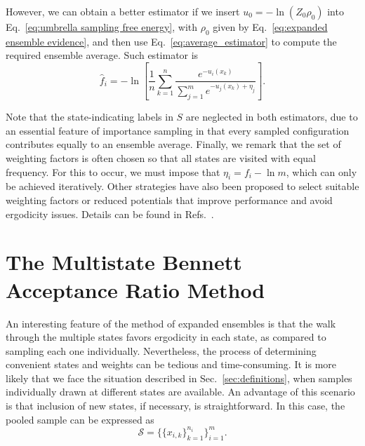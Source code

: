 \documentclass[aip,jcp,reprint,amsmath,amssymb]{revtex4-1}
\begin{document}
However, we can obtain a better estimator if we insert $u_0 = -\ln(Z_0\rho_0)$ into Eq.~\eqref{eq:umbrella sampling free energy}, with $\rho_0$ given by Eq.~\eqref{eq:expanded ensemble evidence}, and then use Eq.~\eqref{eq:average_estimator} to compute the required ensemble average. Such estimator is
\begin{equation}
\label{eq:expanded ensemble FEP estimator}
\hat f_i = -\ln \left[ \frac{1}{n}\sum_{k=1}^n \frac{e^{-u_i(x_k)}}{\sum_{j=1}^m e^{-u_j(x_k) + \eta_j}} \right].
\end{equation}

Note that the state-indicating labels in $S$ are neglected in both estimators, due to an essential feature of importance sampling in that every sampled configuration contributes equally to an ensemble average. Finally, we remark that the set of weighting factors is often chosen so that all states are visited with equal frequency. For this to occur, we must impose that $\eta_i = f_i - \ln m$, which can only be achieved iteratively. Other strategies have also been proposed to select suitable weighting factors or reduced potentials that improve performance and avoid ergodicity issues. Details can be found in Refs.~.

\section{The Multistate Bennett Acceptance Ratio Method}

An interesting feature of the method of expanded ensembles is that the walk through the multiple states favors ergodicity in each state, as compared to sampling each one individually. Nevertheless, the process of determining convenient states and weights can be tedious and time-consuming. It is more likely that we face the situation described in Sec.~\ref{sec:definitions}, when samples individually drawn at different states are available. An advantage of this scenario is that inclusion of new states, if necessary, is straightforward. In this case, the pooled sample can be expressed as
\begin{equation}
\label{eq:pooled sample}
\mathcal S = \Big\{\{x_{i,k}\}_{k=1}^{n_i}\Big\}_{i=1}^m.
\end{equation}
\end{document}
